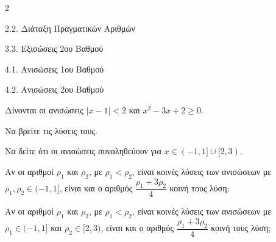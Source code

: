 \begin{ylh}{2}
    \item 2.2. Διάταξη Πραγματικών Αριθμών
    \item 3.3. Εξισώσεις 2ου Βαθμού
    \item 4.1. Ανισώσεις 1ου Βαθμού
    \item 4.2. Ανισώσεις 2ου Βαθμού
\end{ylh}
Δίνονται οι ανισώσεις $|x - 1| < 2$ και $x^2 - 3x + 2 \ge 0$.
\begin{alist}
\item Να βρείτε τις λύσεις τους.
\item Να δείτε ότι οι ανισώσεις συναληθεύουν για $x \in (-1, 1] \cup [2, 3)$.

\item
\begin{rlist}
\item Αν οι αριθμοί $\rho_1$ και $\rho_2$, με $\rho_1 < \rho_2$, είναι κοινές λύσεις των ανισώσεων με $\rho_1, \rho_2 \in (-1, 1]$, είναι και ο αριθμός $\dfrac{\rho_1 + 3\rho_2}{4}$ κοινή τους λύση;
\item Αν οι αριθμοί $\rho_1$ και $\rho_2$, με $\rho_1 < \rho_2$, είναι κοινές λύσεις των ανισώσεων με $\rho_1 \in (-1, 1]$ και $\rho_2 \in [2, 3)$, είναι και ο αριθμός $\dfrac{\rho_1 + 3\rho_2}{4}$ κοινή τους λύση;
\end{rlist}
\end{alist}

